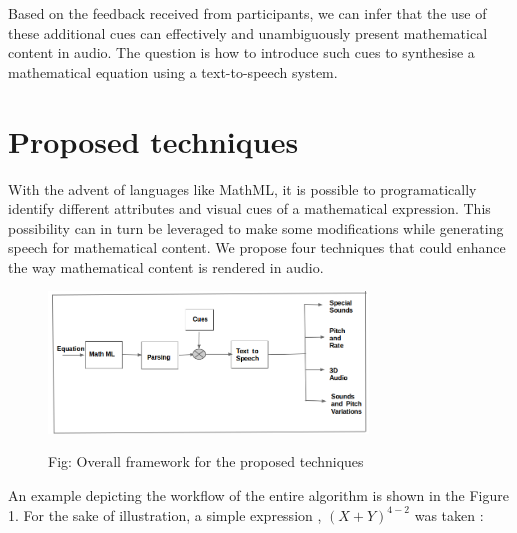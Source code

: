 \documentclass{article}
\begin{document}

Based on the feedback received from participants, we can infer that the use of these additional cues can effectively and unambiguously present mathematical content in audio.   The question is how to introduce such cues to synthesise a mathematical equation using a text-to-speech system.


\section{Proposed techniques}
\label{sec:techniques}
With the advent of languages like MathML, it is possible to programatically identify different attributes and visual cues of a mathematical expression. This possibility can in turn be leveraged to make some modifications  while generating speech for mathematical content.  We propose four techniques that could enhance the way mathematical content is rendered in audio.

\begin{figure}[h]
\label{fig:res}

\begin{minipage}[b]{1.0\linewidth}
  \centering
  
  \centerline{\includegraphics[width=8.5cm]{block}}
 
  \centerline{Fig: Overall framework for the proposed techniques}\medskip
\end{minipage}
\end{figure}

An example depicting the workflow of the entire algorithm is shown in the Figure 1. For the sake of illustration, a simple expression , $(X+Y)^{4-2} $ was taken :
\end{document}

